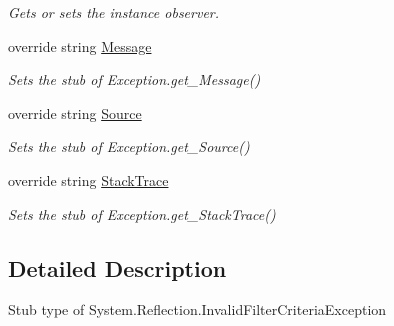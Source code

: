 \begin{DoxyCompactItemize}
\begin{DoxyCompactList}\small\item\em Gets or sets the instance observer.\end{DoxyCompactList}\item 
override string \hyperlink{class_system_1_1_reflection_1_1_fakes_1_1_stub_invalid_filter_criteria_exception_a15d12e3a505ec700d4e68fb5744c8010}{Message}
\begin{DoxyCompactList}\small\item\em Sets the stub of Exception.\-get\-\_\-\-Message()\end{DoxyCompactList}\item 
override string \hyperlink{class_system_1_1_reflection_1_1_fakes_1_1_stub_invalid_filter_criteria_exception_ae35d5c978969c219efeb62d5d17c75e9}{Source}
\begin{DoxyCompactList}\small\item\em Sets the stub of Exception.\-get\-\_\-\-Source()\end{DoxyCompactList}\item 
override string \hyperlink{class_system_1_1_reflection_1_1_fakes_1_1_stub_invalid_filter_criteria_exception_a19634fa92cabeeb057277d3e34ccc323}{Stack\-Trace}
\begin{DoxyCompactList}\small\item\em Sets the stub of Exception.\-get\-\_\-\-Stack\-Trace()\end{DoxyCompactList}\end{DoxyCompactItemize}


\subsection{Detailed Description}
Stub type of System.\-Reflection.\-Invalid\-Filter\-Criteria\-Exception



